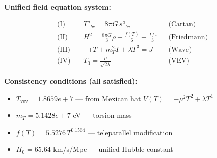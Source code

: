 
\textbf{Unified field equation system:}

\begin{align}
  \text{(I)} \quad & T^a{}_{bc} = 8\pi G \, s^a{}_{bc} && \text{(Cartan)} \\
  \text{(II)} \quad & H^2 = \frac{8\pi G}{3}\rho - \frac{f(T)}{6} + \frac{Tf_T}{3} && \text{(Friedmann)} \\
  \text{(III)} \quad & \Box T + m_T^2 T + \lambda T^3 = J && \text{(Wave)} \\
  \text{(IV)} \quad & T_0 = \frac{\mu}{\sqrt{2\lambda}} && \text{(VEV)}
\end{align}

\textbf{Consistency conditions (all satisfied):}
\begin{itemize}
  \item $T_{\text{vev}} = 1.8659e+7$ — from Mexican hat $V(T) = -\mu^2 T^2 + \lambda T^4$
  \item $m_T = 5.1428e+7$ eV — torsion mass
  \item $f(T) = 5.5276 \, T^{0.1564}$ — teleparallel modification
  \item $H_0 = 65.64$ km/s/Mpc — unified Hubble constant
\end{itemize}